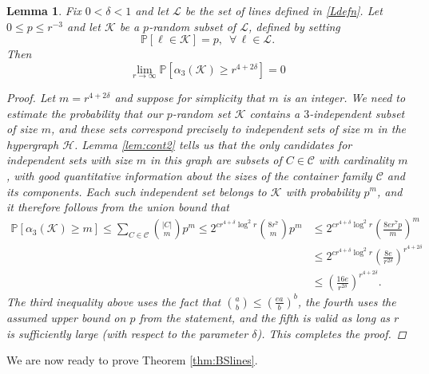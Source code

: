 \documentclass[11pt]{amsart}
\newcommand{\cK}{\mathcal{K}}
\newcommand{\cL}{\mathcal{L}}
\newcommand{\cH}{\mathcal{H}}
\newcommand{\cC}{\mathcal{C}}
\newtheorem{lemma}{Lemma}
\theoremstyle{remark}
\begin{document}
\begin{lemma} \label{lem:whp}
 Fix $0<\delta<1$ and let $\cL$ be the set of lines defined in \eqref{Ldefn}. Let $0 \leq p \leq  r^{-3}$ and let $\cK$ be a $p$-random subset of $\cL$, defined by setting 
 \[
 \mathbb P\left [ \ell \in \mathcal K\right ]=p, \,\,\, \forall \, \ell \in \cL.
 \]
 Then
 \[
 \lim_{r \rightarrow \infty} \mathbb P \left [ \alpha_3(\cK) \geq r^{4+2\delta}\right ] =0
 \]

 \begin{proof}
    Let $m=r^{4+2\delta}$ and suppose for simplicity that $m$ is an integer. We need to estimate the probability that our $p$-random set $\cK$ contains a $3$-independent subset of size $m$, and these sets correspond precisely to independent sets of size $m$ in the hypergraph $\cH$. Lemma \ref{lem:cont2} tells us that the only candidates for independent sets with size $m$ in this graph are subsets of $C \in  \cC$ with cardinality $m$, with good quantitative information about the sizes of the container family $\cC$ and its components. Each such independent set belongs to $\cK$ with probability $p^m$, and it therefore follows from the union bound that
    \begin{align*}
        \mathbb P[ \alpha_3(\cK) \geq m] \leq \sum_{C \in \cC} \binom{|C|}{m} p^m
         \leq 2^{cr^{4+\delta} \log^2 r} \binom{8r^7}{m} p^m
        & \leq 2^{cr^{4+\delta} \log^2 r} \left (\frac{8er^7p}{m} \right)^m
        \\& \leq 2^{cr^{4+\delta} \log^2 r} \left (\frac{8e}{r^{2\delta}} \right)^{r^{4+2\delta}}
        \\& \leq \left (\frac{16e}{r^{2\delta}} \right)^{r^{4+2\delta}}.
    \end{align*}
    The third inequality above uses the fact that $\binom{a}{b} \leq \left ( \frac{ea}{b} \right)^b$, the fourth uses the assumed upper bound on $p$ from the statement, and the fifth is valid as long as $r$ is sufficiently large (with respect to the parameter $\delta$). This completes the proof.
 \end{proof}
 
\end{lemma}


We are now ready to prove Theorem \ref{thm:BSlines}.
\end{document}
